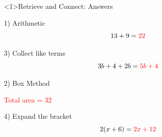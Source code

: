 \documentclass{beamer}
\begin{document}
\begin{frame}<1>{Retrieve and Connect: Answers}
\begin{minipage}[t]{0.48\textwidth}

\begin{block}{1) Arithmetic}
\Large
\[
13 + 9 = \textcolor{red}{22}
\]
\end{block}

\vspace{6.2em}

\begin{block}{3) Collect like terms}
\Large
\[
3b + 4 + 2b = \textcolor{red}{5b + 4}
\]
\end{block}

\end{minipage}\hfill
\begin{minipage}[t]{0.48\textwidth}

\begin{block}{2) Box Method}
\centering
{}

\vspace{0.4em}
\textcolor{red}{Total area = 32}

\end{block}

\vspace{0.6em}

\begin{block}{4) Expand the bracket}
\Large
\[
2(x+6) = \textcolor{red}{2x + 12}
\]
\end{block}

\end{minipage}
\end{frame}
\end{document}
